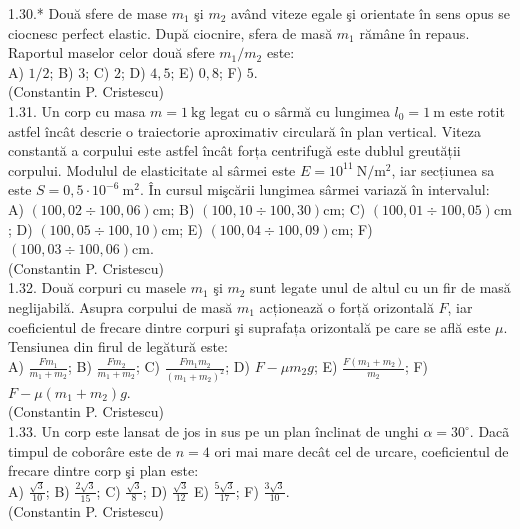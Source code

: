 1.30.* Două sfere de mase $m_{1}$ şi $m_{2}$ având viteze egale şi orientate în sens opus se ciocnesc perfect elastic. După ciocnire, sfera de masă $m_{1}$ rămâne în repaus. Raportul maselor celor două sfere $m_{1} / m_{2}$ este:\\ A) $1 / 2$; B) $3$; C) $2$; D) $4,5$; E) $0,8$; F) $5$.\\ (Constantin P. Cristescu)\\

1.31. Un corp cu masa $m=1 \mathrm{~kg}$ legat cu o sârmă cu lungimea $l_{0}=1 \mathrm{~m}$ este rotit astfel încât descrie o traiectorie aproximativ circulară în plan vertical. Viteza constantă a corpului este astfel încât forța centrifugă este dublul greutății corpului. Modulul de elasticitate al sârmei este $E=10^{11} \mathrm{~N} / \mathrm{m}^{2}$, iar secțiunea sa este $S=0,5 \cdot 10^{-6} \mathrm{~m}^{2}$. În cursul mişcării lungimea sârmei variază în intervalul:\\ A) $(100,02 \div 100,06) \mathrm{cm}$; B) $(100,10 \div 100,30) \mathrm{cm}$; C) $(100,01 \div 100,05) \mathrm{cm}$; D) $(100,05 \div 100,10) \mathrm{cm}$; E) $(100,04 \div 100,09) \mathrm{cm}$; F) $(100,03 \div 100,06) \mathrm{cm}$.\\ (Constantin P. Cristescu)\\

1.32. Două corpuri cu masele $m_{1}$ şi $m_{2}$ sunt legate unul de altul cu un fir de masă neglijabilă. Asupra corpului de masă $m_{1}$ acționează o forță orizontală $F$, iar coeficientul de frecare dintre corpuri şi suprafața orizontală pe care se află este $\mu$. Tensiunea din firul de legătură este:\\ A) $\frac{F m_{1}}{m_{1}+m_{2}}$; B) $\frac{F m_{2}}{m_{1}+m_{2}}$; C) $\frac{F m_{1} m_{2}}{\left(m_{1}+m_{2}\right)^{2}}$; D) $F-\mu m_{2} g$; E) $\frac{F\left(m_{1}+m_{2}\right)}{m_{2}}$; F) $F-\mu\left(m_{1}+m_{2}\right) g$.\\ (Constantin P. Cristescu)\\

1.33. Un corp este lansat de jos in sus pe un plan înclinat de unghi $\alpha=30^{\circ}$. Dacã timpul de coborâre este de $n=4$ ori mai mare decât cel de urcare, coeficientul de frecare dintre corp şi plan este:\\ A) $\frac{\sqrt{3}}{10}$; B) $\frac{2 \sqrt{3}}{15}$; C) $\frac{\sqrt{3}}{8}$; D) $\frac{\sqrt{3}}{12}$ E) $\frac{5 \sqrt{3}}{17}$; F) $\frac{3 \sqrt{3}}{10}$.\\ (Constantin P. Cristescu)\\

